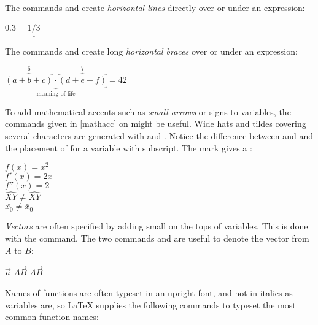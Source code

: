 The commands  and  create
\emph{horizontal lines} directly over or under an expression:%
\begin{example}
$0.\overline{3} = 
 \underline{\underline{1/3}}$
\end{example}

The commands  and  create
long \emph{horizontal braces} over or under an expression:%
\begin{example}[examplewidth=0.45\linewidth]
$\underbrace{\overbrace{(a+b+c)}^6 
 \cdot \overbrace{(d+e+f)}^7}
 _\text{meaning of life} = 42$
\end{example}

To add mathematical accents such as \emph{small
  arrows} or \emph{} signs to variables, the commands
given in \autoref{mathacc} on  might be useful.  Wide hats and
tildes covering several characters are generated with 
and . Notice the difference between  and  and the placement of
 for a variable with subscript. The  mark
 gives a :
\begin{example}
$f(x) = x^2$ \\
$f'(x) = 2x$ \\
$f''(x) = 2$ \\
$\hat{XY} \neq \widehat{XY}$ \\
$\bar{x_0} \neq \bar{x}_0$
\end{example}

\emph{Vectors} are often specified by adding small
 on the tops of variables. This is done with the
 command. The two commands  and
 are useful to denote the vector from $A$ to $B$:
\begin{example}
$\vec{a}$ $\vec{AB}$
$\overrightarrow{AB}$
\end{example}

Names of functions are often typeset in an upright
font, and not in italics as variables are, so \LaTeX{} supplies the
following commands to typeset the most common function names:%

